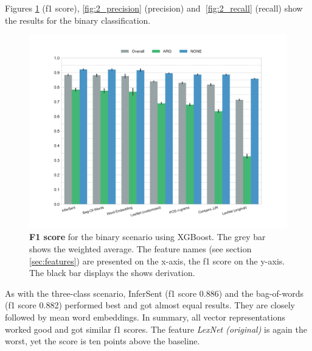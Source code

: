 \FloatBarrier

Figures \ref{fig:2_f1} (f1 score), \ref{fig:2_precision} (precision) and \ref{fig:2_recall} (recall) show the results for the binary classification.
\begin{figure}[htbp]
      \caption{\textbf{F1 score} for the binary scenario using XGBoost. The grey bar shows the weighted average. The feature names (see section \ref{sec:features}) are presented on the x-axis, the f1 score on the y-axis. The black bar displays the shows derivation.} 
 
    \label{fig:2_f1}
 \centering
	\includegraphics[width=1\textwidth]{images/experiments/f1-True}

\end{figure}
As with the three-class scenario, InferSent (f1 score 0.886) and the bag-of-words (f1 score 0.882) performed best and got almost equal results. They are closely followed by mean word embeddings. In summary, all vector representations worked good and got similar f1 scores. The feature \emph{LexNet (original)} is again the worst, yet the score is ten points above the baseline.%







